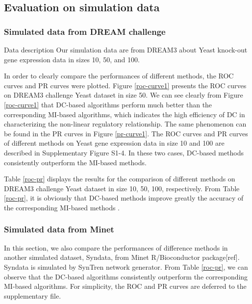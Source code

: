 \documentclass{bioinfo}
\begin{document}
\subsection{Evaluation on simulation data}
\subsubsection{Simulated data from DREAM challenge}
{\color{red} Data description} Our simulation data are from DREAM3 about Yeast knock-out gene expression data in sizes
10, 50, and 100.

In order to clearly compare the performances of different methods, the ROC curves and PR curves were plotted.  Figure \ref{roc-curve1} presents the ROC curves on DREAM3 challenge Yeast dataset in size 50. We can see clearly from Figure \ref{roc-curve1} that DC-based algorithms perform much better than the corresponding MI-based algorithms, which indicates the high efficiency of DC in characterizing the non-linear regulatory relationship.
The same phenomenon can be found in the PR curves in Figure \ref{pr-curve1}. The ROC curves and PR curves of different methods on Yeast gene expression data in size 10 and 100 are described in Supplementary Figure S1-4. In these two cases, DC-based methods consistently outperform  the MI-based methods.

Table \ref{roc-pr} displays the results for the comparison of different methods on DREAM3 challenge Yeast dataset in size 10, 50, 100, respectively. From Table \ref{roc-pr}, it is obviously that DC-based methods improve greatly the accuracy of the corresponding MI-based methods .

\subsubsection{Simulated data from Minet} In this section, we also compare the performances of difference methods in another simulated dataset, Syndata, from Minet R/Bioconductor package[ref]. Syndata is simulated by SynTren network generator. From Table \ref{roc-pr}, we can observe that the DC-based algorithms  consistently outperform the corresponding MI-based algorithms.  For simplicity, the ROC and PR curves are deferred to the supplementary file.
\end{document}
